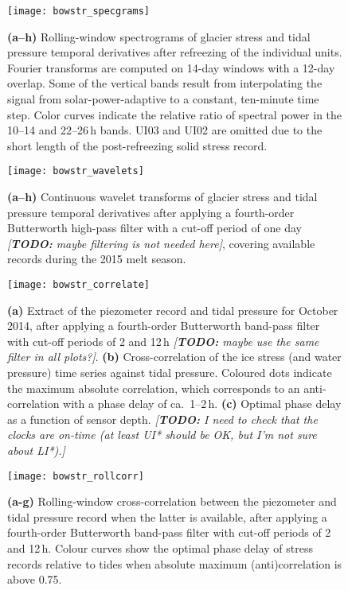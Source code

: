 \documentclass[utf8]{article}
\newcommand{\todo}[1]{\textcolor{c3}{\emph{[\textbf{TODO:} #1]}}}
\begin{document}
    \begin{figure}
      \centerline{\texttt{[image: bowstr\_specgrams]}}
      \caption{%
        \textbf{(a--h)}
          Rolling-window spectrograms of glacier stress and tidal pressure
          temporal derivatives after refreezing of the individual units.
          Fourier transforms are computed on 14-day windows with a 12-day
          overlap. Some of the vertical bands result from interpolating the
          signal from solar-power-adaptive to a constant, ten-minute time step.
          Color curves indicate the relative ratio of spectral power in the
          10--14 and 22--26\,h bands. UI03 and UI02 are omitted due to the
          short length of the post-refreezing solid stress record.}
      \label{fig:specgrams}
    \end{figure}

    \begin{figure}
      \centerline{\texttt{[image: bowstr\_wavelets]}}
      \caption{%
        \textbf{(a--h)}
          Continuous wavelet transforms of glacier stress and tidal pressure
          temporal derivatives after applying a fourth-order Butterworth
          high-pass filter with a cut-off period of one day \todo{maybe
          filtering is not needed here}, covering available records during the
          2015 melt season.}
      \label{fig:wavelets}
    \end{figure}

    \begin{figure}
      \centerline{\texttt{[image: bowstr\_correlate]}}
      \caption{%
        \textbf{(a)}
          Extract of the piezometer record and tidal pressure for October 2014,
          after applying a fourth-order Butterworth band-pass filter with
          cut-off periods of 2 and 12\,h \todo{maybe use the same filter in all
          plots?}.
        \textbf{(b)}
          Cross-correlation of the ice stress (and water pressure) time series
          against tidal pressure. Coloured dots indicate the maximum absolute
          correlation, which corresponds to an anti-correlation with a phase
          delay of ca.~1--2\,h.
        \textbf{(c)}
          Optimal phase delay as a function of sensor depth.
        \todo{
          I need to check that the clocks are on-time (at least UI* should be
          OK, but I'm not sure about LI*).}}
      \label{fig:correlate}
    \end{figure}

    \begin{figure}
      \centerline{\texttt{[image: bowstr\_rollcorr]}}
      \caption{%
        \textbf{(a-g)}
          Rolling-window cross-correlation between the piezometer and tidal
          pressure record when the latter is available, after applying a
          fourth-order Butterworth band-pass filter with cut-off periods of 2
          and 12\,h. Colour curves show the optimal phase delay of stress
          records relative to tides when absolute maximum (anti)correlation is
          above 0.75.}
      \label{fig:rollcorr}
    \end{figure}


\end{document}
